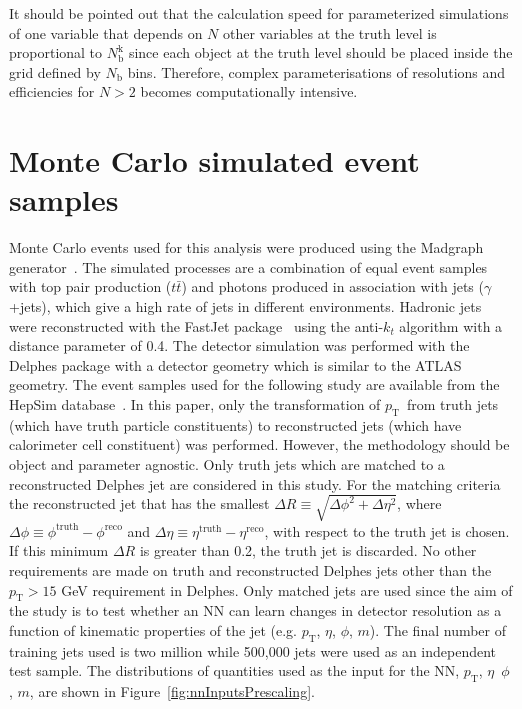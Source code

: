 \documentclass[showpacs,showkeys,preprint,prd,nofootinbib,linenumbers,12pt,superscriptaddress]{revtex4-1}
\def\pt{\ensuremath{p_{\mathrm{T}}}}
\begin{document}
It should be pointed out that the calculation speed for parameterized simulations of one variable that depends on $N$ other variables at the truth level is proportional to $N_{\mathrm{b}}^{\mathrm{k}}$ since each object at the truth level should be placed inside the grid defined by $N_{\mathrm{b}}$ bins. Therefore, complex parameterisations of resolutions and efficiencies for $N>2$ becomes computationally intensive. 


\FloatBarrier
\section{Monte Carlo simulated event samples}
\label{sec:samples}
Monte Carlo events used for this analysis were produced using the Madgraph generator~\cite{Alwall:2014hca}. The simulated processes are a combination of equal event samples with  top pair production ($t\bar{t}$) and photons produced in association with jets ($\gamma$+jets), which give a high rate of jets in different environments. 
Hadronic jets were reconstructed with the {\sc FastJet} package~\cite{Fastjet} using the anti-$k_t$ algorithm \cite{Cacciari:2008gp} with a distance parameter of 0.4. The detector simulation was performed with the Delphes package with a detector geometry which is similar to the ATLAS geometry. 
The event samples used for the following study are available from the HepSim database~\cite{Chekanov:2014fga}. In this paper, only the transformation of \pt\ from truth jets (which have truth particle constituents) to reconstructed jets (which have calorimeter cell constituent) was performed. However, the methodology should be object and parameter agnostic. Only truth jets which are matched to a reconstructed Delphes jet are considered in this study. For the matching criteria the reconstructed jet that has the smallest $\Delta R\equiv\sqrt{\Delta\phi^2+\Delta\eta^2}$, where $\Delta\phi\equiv\phi^{\text{truth}}-\phi^{\text{reco}}$ and $\Delta\eta\equiv\eta^{\text{truth}}-\eta^{\text{reco}}$, with respect to the truth jet is chosen. If this minimum $\Delta R$ is greater than 0.2, the truth jet is discarded. No other requirements are made on truth and reconstructed Delphes jets other than the $\pt>15$ GeV requirement in Delphes. Only matched jets are used since the aim of the study is to test whether an NN can learn changes in detector resolution as a function of kinematic properties of the jet (e.g. $\pt$, $\eta$, $\phi$, $m$). 
The final number of training jets used is two million while 500,000 jets were used as an independent test sample. The distributions of quantities used as the input for the NN, \pt, $\eta$\, $\phi$, $m$, are shown in Figure~\ref{fig:nnInputsPrescaling}.
\end{document}
